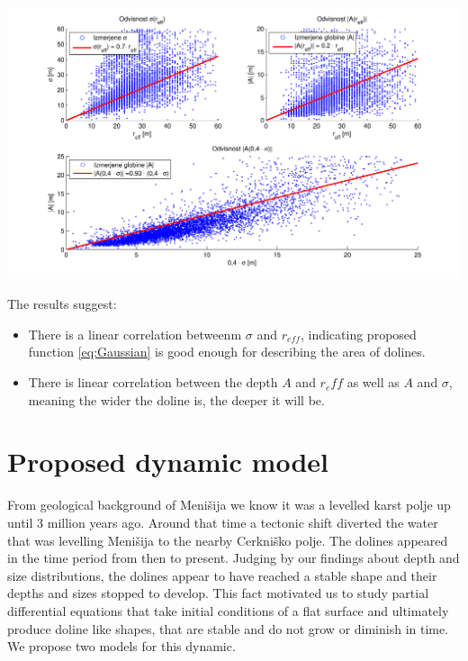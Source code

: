 \documentclass[a0,portrait]{a0poster}
\begin{document}
\begin{multicols}{2}
\begin{center}
\includegraphics[width=\linewidth]{menisija-A-sigma-reff.pdf}
\label{fig:vrtace-fit}
\end{center}

The results suggest:
\begin{itemize}
	\item There is a linear correlation betweenm $\sigma$ and $r_{eff}$, indicating proposed function \ref{eq:Gaussian} is good enough for describing the area of dolines.
	\item There is linear correlation between the depth $A$ and $r_eff$ as well as $A$ and $\sigma$, meaning the wider the doline is, the deeper it will be.
\end{itemize}



\section*{Proposed dynamic model}

From geological background of Menišija we know it was a levelled karst polje up until 3 million years ago. Around that time a tectonic shift diverted the water that was levelling Menišija to the nearby Cerkniško polje. The dolines appeared in the time period from then to present. Judging by our findings about depth and size distributions, the dolines appear to have reached a stable shape and their depths and sizes stopped to develop.
This fact motivated us to study partial differential equations that take initial conditions of a flat surface and ultimately produce doline like shapes, that are stable and do not grow or diminish in time. We propose two models for this dynamic.


\end{multicols}
\end{document}
